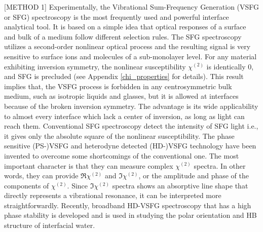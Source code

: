 [METHOD 1]
Experimentally, the Vibrational Sum-Frequency Generation (VSFG or SFG) spectroscopy is the most frequently used and powerful interface analytical tool\cite{Shen2016,Morita2018,Shen2020}.
It is based on a simple idea that optical responses of a surface and bulk of a medium follow different selection rules.
The SFG spectroscopy utilizes a second-order nonlinear optical process and the resulting signal is very sensitive to surface ions and 
molecules of a sub-monolayer level\cite{Morita2008,WangHongFei2015,WenYuChieh2016,Ishiyama2017,Penalber-Johnstone2018}. 
%
For any material exhibiting inversion symmetry, the nonlinear susceptibility $\chi^{(2)}$ is identically 0, and SFG is precluded\cite{Franken1963} (see Appendix \ref{chi_properties} for details).
This result implies that, the VSFG process is forbidden in any centrosymmetric bulk medium\cite{Che2012},
such as isotropic liquids and glasses, but it is allowed at interfaces because of the broken inversion symmetry\cite{PF00}.
The advantage is its wide applicability to almost every interface which lack a center of inversion, as long as light can reach them. 
%
Conventional SFG spectroscopy detect the intensity of SFG light
i.e., it gives only the absolute square of the nonlinear susceptibility\cite{Shen84,Guyot-Sionnest1986,Shen2020}. 
The phase sensitive (PS-)VSFG\cite{Ji2008} and heterodyne detected (HD-)VSFG technology have been invented to overcome some shortcomings of the conventional one. 
The most important character is that they can measure complex $\chi^{(2)}$ spectra. 
In other words, they can provide $\Re \chi^{(2)}$ and $\Im \chi^{(2)}$, or the amplitude and phase of the components of $\chi^{(2)}$. 
Since $\Im \chi^{(2)}$ spectra shows an absorptive line shape that directly represents a vibrational resonance, 
it can be interpreted more straightforwardly\cite{Nihonyanagi2013}.
Recently, broadband HD-VSFG spectroscopy that has a high phase stability is developed and is used in studying the polar orientation and HB structure of interfacial
water\cite{Nihonyanagi2009,Shen2013}. 

